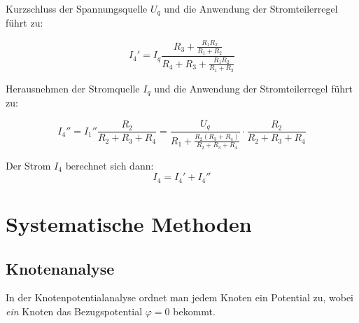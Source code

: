 \documentclass[german, 10pt, a4paper, headsepline]{scrreprt}
\theoremstyle{remark}
\begin{document}
Kurzschluss der Spannungsquelle $U_q$ und die Anwendung der Stromteilerregel f\"uhrt zu:

\begin{displaymath}
	I_4'=I_q\frac{R_3+\frac{R_1 R_2}{R_1 + R_2}}{R_4+R_3+\frac{R_1 R_2}{R_1+R_2}}
\end{displaymath}

Herausnehmen der Stromquelle $I_q$ und die Anwendung der Stromteilerregel f\"uhrt zu:

\begin{displaymath}
	I_4 '' = I_1 '' \frac{R_2}{R_2+R_3+R_4} = \frac{U_q}{R_1+\frac{R_2(R_3+R_4)}{R_2+R_3+R_4}}\cdotp\frac{R_2}{R_2+R_3+R_4}
\end{displaymath}

Der Strom $I_4$ berechnet sich dann:
\begin{displaymath}
	I_4=I_4'+I_4''
\end{displaymath}


\section{Systematische Methoden}

\subsection{Knotenanalyse}

In der Knotenpotentialanalyse ordnet man jedem Knoten ein Potential zu, wobei \textit{ein} Knoten das Bezugspotential $\varphi = 0$ bekommt.
\end{document}
